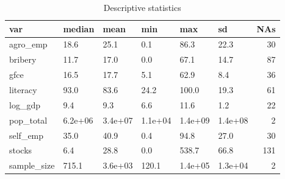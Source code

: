 \begin{table}[ht]
\centering
\begin{tabular}{llllllr}
  \hline
var & median & mean & min & max & sd & NAs \\ 
  \hline
agro\_emp & 18.6 & 25.1 & 0.1 & 86.3 & 22.3 &  30 \\ 
  bribery & 11.7 & 17.0 & 0.0 & 67.1 & 14.7 &  87 \\ 
  gfce & 16.5 & 17.7 & 5.1 & 62.9 & 8.4 &  36 \\ 
  literacy & 93.0 & 83.6 & 24.2 & 100.0 & 19.3 &  61 \\ 
  log\_gdp & 9.4 & 9.3 & 6.6 & 11.6 & 1.2 &  22 \\ 
  pop\_total & 6.2e+06 & 3.4e+07 & 1.1e+04 & 1.4e+09 & 1.4e+08 &   2 \\ 
  self\_emp & 35.0 & 40.9 & 0.4 & 94.8 & 27.0 &  30 \\ 
  stocks & 6.4 & 28.8 & 0.0 & 538.7 & 66.8 & 131 \\ 
  sample\_size & 715.1 & 3.6e+03 & 120.1 & 1.4e+05 & 1.3e+04 &   2 \\ 
   \hline
\end{tabular}
\caption{Descriptive statistics} 
\label{desc}
\end{table}

